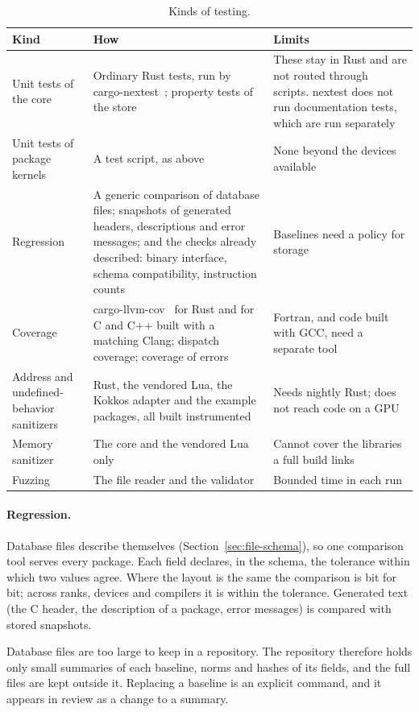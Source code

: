 \documentclass[11pt,a4paper]{article}
\begin{document}
\begin{table}[ht]
\centering
\small
\begin{tabularx}{\textwidth}{@{}>{\raggedright\arraybackslash}p{30mm} L L@{}}
\toprule
Kind & How & Limits \\
\midrule
Unit tests of the core & Ordinary Rust tests, run by cargo-nextest~\cite{nextest}; property tests of the store~\cite{proptest} & These stay in Rust and are not routed through scripts.  nextest does not run documentation tests, which are run separately \\
Unit tests of package kernels & A test script, as above & None beyond the devices available \\
Regression & A generic comparison of database files; snapshots of generated headers, descriptions and error messages; and the checks already described: binary interface, schema compatibility, instruction counts & Baselines need a policy for storage \\
Coverage & cargo-llvm-cov~\cite{cargollvmcov} for Rust and for C and C++ built with a matching Clang; dispatch coverage; coverage of errors & Fortran, and code built with GCC, need a separate tool \\
Address and undefined-behavior sanitizers & Rust, the vendored Lua, the Kokkos adapter and the example packages, all built instrumented & Needs nightly Rust; does not reach code on a GPU \\
Memory sanitizer & The core and the vendored Lua only & Cannot cover the libraries a full build links \\
Fuzzing & The file reader and the validator & Bounded time in each run \\
\bottomrule
\end{tabularx}
\caption{Kinds of testing.}
\label{tab:testkinds}
\end{table}

\paragraph{Regression.}  Database files describe themselves
(Section~\ref{sec:file-schema}), so one comparison tool serves every
package.  Each field declares, in the schema, the tolerance within which
two values agree.  Where the layout is the same the comparison is bit for
bit; across ranks, devices and compilers it is within the tolerance.
Generated text (the C header, the description of a package, error messages)
is compared with stored snapshots.

Database files are too large to keep in a repository.  The repository
therefore holds only small summaries of each baseline, norms and hashes of
its fields, and the full files are kept outside it.  Replacing a baseline is
an explicit command, and it appears in review as a change to a summary.
\end{document}
